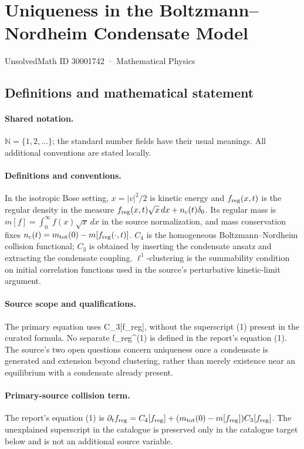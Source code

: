 \documentclass[11pt]{article}
\begin{document}
\setcounter{section}{30001741}
\section{Uniqueness in the Boltzmann–Nordheim Condensate Model}\label{30001742}
{\small UnsolvedMath ID 30001742 · Mathematical Physics}
\subsection{Definitions and mathematical statement}

\paragraph{Shared notation.}$\mathbb N=\{1,2,\ldots\}$; the standard number fields have their usual meanings. All additional conventions are stated locally.


\paragraph{Definitions and conventions.} In the isotropic Bose setting, $x=|v|^2/2$ is kinetic energy and $f_{\rm reg}(x,t)$ is the regular density in the measure $f_{\rm reg}(x,t)\sqrt{x}\,dx+n_c(t)\delta_0$. Its regular mass is $m[f]=\int_0^\infty f(x)\sqrt{x}\,dx$ in the source normalization, and mass conservation fixes $n_c(t)=m_{\rm tot}(0)-m[f_{\rm reg}(\cdot,t)]$. $C_4$ is the homogeneous Boltzmann--Nordheim collision functional; $C_3$ is obtained by inserting the condensate ansatz and extracting the condensate coupling. $\ell^1$-clustering is the summability condition on initial correlation functions used in the source's perturbative kinetic-limit argument.

\paragraph{Source scope and qualifications.} The primary equation uses C\_3[f\_reg], without the superscript (1) present in the curated formula. No separate f\_reg^(1) is defined in the report's equation (1). The source's two open questions concern uniqueness once a condensate is generated and extension beyond clustering, rather than merely existence near an equilibrium with a condensate already present.

\paragraph{Primary-source collision term.} The report's equation (1) is $\partial_t f_{\rm reg}=C_4[f_{\rm reg}]+(m_{\rm tot}(0)-m[f_{\rm reg}])C_3[f_{\rm reg}]$. The unexplained superscript in the catalogue is preserved only in the catalogue target below and is not an additional source variable.
\end{document}
